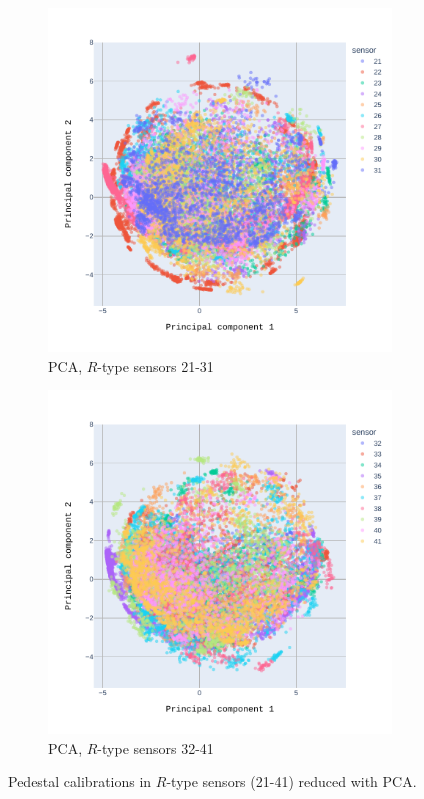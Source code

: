 \begin{figure}
\centering
  \begin{subfigure}[b]{0.7\textwidth}
    \centering
    \includegraphics[width=\linewidth]{figures/chapter4/dimred/PCA_pedestals_r_phi_2.pdf}
    \caption{PCA, $R$-type sensors 21-31}
    \label{plot:PCA_pedestals_2}
  \end{subfigure}
  \begin{subfigure}[b]{0.7\textwidth}
    \centering
    \includegraphics[width=\linewidth]{figures/chapter4/dimred/PCA_pedestals_r_phi_3.pdf}
    \caption{PCA, $R$-type sensors 32-41}
    \label{plot:PCA_pedestals_3}
  \end{subfigure}

\caption[All calibrationb]{Pedestal calibrations in $R$-type sensors (21-41) reduced with PCA.}
\label{plot:pca_all_pedb}
\end{figure}
